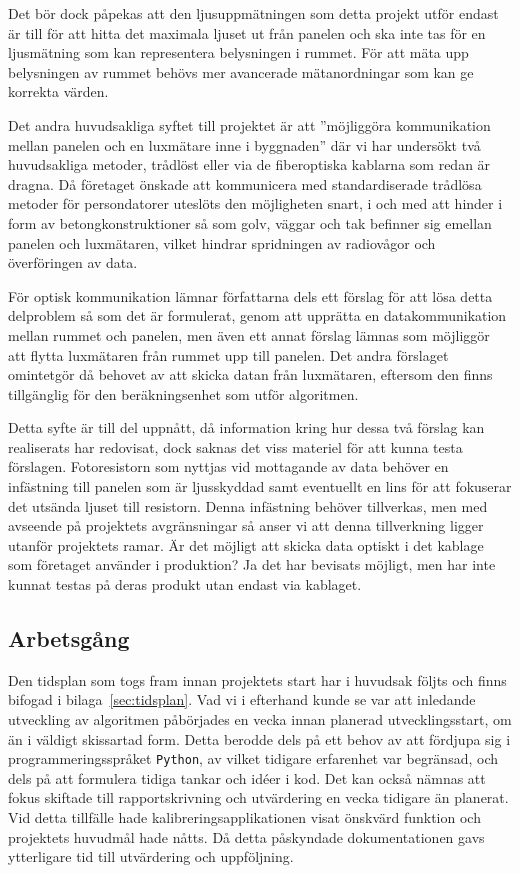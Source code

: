         Det bör dock påpekas att den ljusuppmätningen som detta projekt utför endast är till för att hitta det maximala ljuset ut från panelen och ska inte tas för en ljusmätning som kan representera belysningen i rummet. För att mäta upp belysningen av rummet behövs mer avancerade mätanordningar som kan ge korrekta värden.\bigskip

        Det andra huvudsakliga syftet till projektet är att ''möjliggöra kommunikation mellan panelen och en luxmätare inne i byggnaden'' där vi har undersökt två huvudsakliga metoder, trådlöst eller via de fiberoptiska kablarna som redan är dragna. Då företaget önskade att kommunicera med standardiserade trådlösa metoder för persondatorer uteslöts den möjligheten snart, i och med att hinder i form av betongkonstruktioner så som golv, väggar och tak befinner sig emellan panelen och luxmätaren, vilket hindrar spridningen av radiovågor och överföringen av data.\bigskip

        För optisk kommunikation lämnar författarna dels ett förslag för att lösa detta delproblem så som det är formulerat, genom att upprätta en datakommunikation mellan rummet och panelen, men även ett annat förslag lämnas som möjliggör att flytta luxmätaren från rummet upp till panelen. Det andra förslaget omintetgör då behovet av att skicka datan från luxmätaren, eftersom den finns tillgänglig för den beräkningsenhet som utför algoritmen.\bigskip

        Detta syfte är till del uppnått, då information kring hur dessa två förslag kan realiserats har redovisat, dock saknas det viss materiel för att kunna testa förslagen. Fotoresistorn som nyttjas vid mottagande av data behöver en infästning till panelen som är ljusskyddad samt eventuellt en lins för att fokuserar det utsända ljuset till resistorn. Denna infästning behöver tillverkas, men med avseende på projektets avgränsningar så anser vi att denna tillverkning ligger utanför projektets ramar. Är det möjligt att skicka data optiskt i det kablage som företaget använder i produktion? Ja det har bevisats möjligt, men har inte kunnat testas på deras produkt utan endast via kablaget.

    \subsection{Arbetsgång} %
    \label{sub:arbetsg_ng}
        Den tidsplan som togs fram innan projektets start har i huvudsak följts och finns bifogad i bilaga~\ref{sec:tidsplan}. Vad vi i efterhand kunde se var att inledande utveckling av algoritmen påbörjades en vecka innan planerad utvecklingsstart, om än i väldigt skissartad form. Detta berodde dels på ett behov av att fördjupa sig i programmeringsspråket \texttt{Python}, av vilket tidigare erfarenhet var begränsad, och dels på att formulera tidiga tankar och idéer i kod. Det kan också nämnas att fokus skiftade till rapportskrivning och utvärdering en vecka tidigare än planerat. Vid detta tillfälle hade kalibreringsapplikationen visat önskvärd funktion och projektets huvudmål hade nåtts. Då detta påskyndade dokumentationen gavs ytterligare tid till utvärdering och uppföljning.\bigskip

